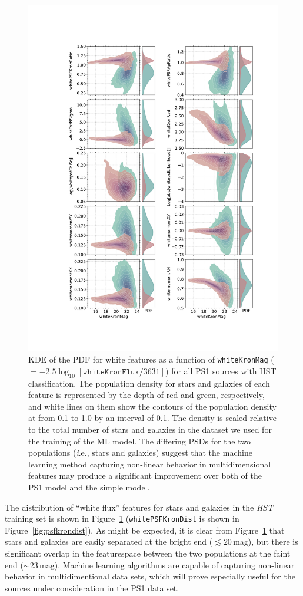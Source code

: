 \documentclass[twocolumn]{aastex62}
\begin{document}
\begin{figure}[t]
 \centering
  \includegraphics[width=3.5in
  ]{./Figures/whiteFeatures.pdf}
  \caption{
  KDE of the PDF for white features as a function of \texttt{whiteKronMag}
  ($=-2.5\log_{10}[\mathtt{whiteKronFlux}/3631]$) 
  for all PS1 sources with HST classification. 
  The population density for stars and galaxies of each feature is represented by the depth of red and green, respectively, 
  and white lines on them show the contours of the population density at from 0.1 to 1.0 by an interval of 0.1.
  The density is scaled relative to the total number of stars and galaxies in the dataset we used for the training of the ML model. 
  The differing PSDs for the two populations ({\textit i.e.,} stars and galaxies) suggest that 
  the machine learning method capturing non-linear behavior in multidimensional features 
  may produce a significant improvement over both of the PS1 model and the simple model. }
  \label{fig:features}
\end{figure}

The distribution of ``white flux'' features for stars and galaxies in the \textit{HST} training set is shown in Figure~\ref{fig:features} (\texttt{whitePSFKronDist} is shown in Figure~\ref{fig:psfkrondist}). As might be expected, it is clear from Figure~\ref{fig:features} that stars and galaxies are easily separated at the bright end ($\lesssim 20$\,mag), but there is significant overlap in the featurespace between the two populations at the faint end ($\sim$23\,mag). Machine learning algorithms are capable of capturing non-linear behavior in multidimentional data sets, which will prove especially useful for the sources under consideration in the PS1 data set. 
\end{document}
